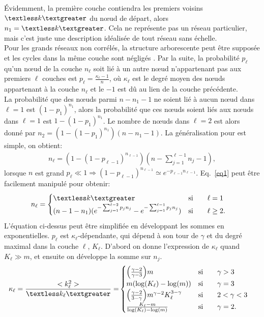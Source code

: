 Évidemment, la première couche contiendra les premiers voisins $\km$ du nœud de départ, alors $n_1=\km$. Cela ne représente pas un réseau particulier, mais c'est juste une description idéalisée de tout réseau sans échelle. \\
Pour les grands réseaux non corrélés, la structure arborescente peut être supposée et les cycles dans la même couche sont négligés \cite{Cohen-Havlin2003,Cohen-Havlin2009}. Par la suite, la probabilité $ p_{\ell} $ qu'un nœud de la couche $n_\ell$ soit lié à un autre nœud n'appartenant pas aux premiers $\ell$ couches est $p_{\ell}=\frac{\kappa_{\ell}-1}{n}$, où $\kappa_{\ell}$ est le degré moyen des nœuds appartenant à la couche $n_\ell$ et le $-1$ est dû au lien de la couche précédente. \\
La probabilité que des nœuds parmi $n-n_1-1$ ne soient lié à aucun nœud dans $\ell=1$ est $(1-p_1)^{n_1}$, alors la probabilité que ces nœuds soient liés aux nœuds dans $\ell=1$ est $1-(1-p_1)^{n_1}$. Le nombre de nœuds dans $\ell=2$ est alors donné par $n_2=(1- (1-p_1)^{n_1})(n-n_1-1)$. La généralisation pour \nl est simple, on obtient:
\begin{align}
n_{\ell}= (1-(1-p_{\ell-1})^{n_{\ell-1}})(n-\sum_{j=1}^{\ell-1} n_j-1),
\label{eq1}
\end{align}
lorsque $n$ est grand $p_{\ell}\ll1 \Longrightarrow (1-p_{\ell-1})^{n_{\ell-1}}\simeq e^{-p_{\ell-1}n_{\ell-1}} $. Eq.~\eqref{eq1}
peut être facilement manipulé pour obtenir:
\begin{align}
n_{\ell} &=
\begin{cases}
\km & \text{si}\qquad \ell=1 \\
(n-1-n_1)(e^{-\sum_{j=1}^{\ell-2}p_j n_j}-e^{-\sum_{j=1}^{\ell-1}p_j n_j}) & \text{si}\qquad \ell \ge 2.
\end{cases}
\label{eq2}
\end{align}
L'équation ci-dessus peut être simplifiée en développant les sommes en exponentielles. $p_{\ell}$ est $\kappa_{\ell}$-dépendante, qui dépend à son tour de $\gamma$ et du degré maximal dans la couche $\ell$, $K_{\ell}$. D'abord on donne l'expression de $\kappa_{\ell}$ quand $K_{\ell}\gg m$, et ensuite on développe la somme sur $n_j$.
\begin{align}
\kappa_{\ell} =\frac{<k_{\ell}^2>}{\textless k_{\ell} \textgreater}=&
\begin{cases}
\Big(\frac{\gamma-2}{\gamma-3}\Big)m & \text{si} \qquad \gamma >3 \\ 
m (\log(K_{\ell})-\log(m))  & \text{si} \qquad \gamma =3 \\
\Big(\frac{\gamma-2}{3-\gamma}\Big)m^{\gamma-2} K_{\ell}^{3-\gamma}  & \text{si} \qquad 2<\gamma<3 \\
\frac{K_{\ell}-m}{\log(K_{\ell})-\log(m)} & \text{si} \qquad \gamma=2.
\end{cases}
\label{eq4}
\end{align}
